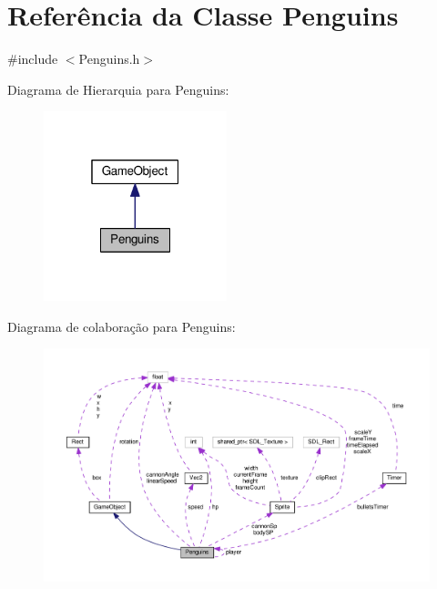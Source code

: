 \hypertarget{classPenguins}{\section{Referência da Classe Penguins}
\label{classPenguins}
}


{\ttfamily \#include $<$Penguins.\+h$>$}



Diagrama de Hierarquia para Penguins\+:\nopagebreak
\begin{figure}[H]
\begin{center}
\leavevmode
\includegraphics[width=151pt]{classPenguins__inherit__graph}
\end{center}
\end{figure}


Diagrama de colaboração para Penguins\+:
\nopagebreak
\begin{figure}[H]
\begin{center}
\leavevmode
\includegraphics[width=350pt]{classPenguins__coll__graph}
\end{center}
\end{figure}
